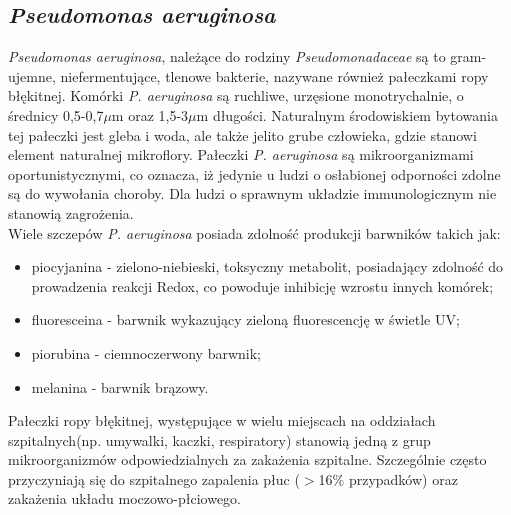 \documentclass[11pt,a4paper]{report}
\begin{document}
\subsection{\textit{Pseudomonas aeruginosa}}
\textit{Pseudomonas aeruginosa}, należące do rodziny \textit{Pseudomonadaceae} są to gram-ujemne, niefermentujące, tlenowe bakterie, nazywane również pałeczkami ropy błękitnej. Komórki \textit{P. aeruginosa} są ruchliwe, urzęsione monotrychalnie, o średnicy 0,5-0,7$\mu$m oraz 1,5-3$\mu$m długości\cite{ps_aer_ksiazka, medical_micro}.
Naturalnym środowiskiem bytowania tej pałeczki jest gleba i woda, ale także jelito grube człowieka, gdzie stanowi element naturalnej mikroflory.
Pałeczki \textit{P. aeruginosa} są mikroorganizmami oportunistycznymi, co oznacza, iż jedynie u ludzi o osłabionej odporności zdolne są do wywołania choroby. Dla ludzi o sprawnym układzie immunologicznym nie stanowią zagrożenia\cite{ps_aer_ksiazka}.\\
Wiele szczepów \textit{P. aeruginosa} posiada zdolność produkcji barwników takich jak:
\begin{itemize}
\item piocyjanina - zielono-niebieski, toksyczny metabolit, posiadający zdolność do prowadzenia reakcji Redox, co powoduje inhibicję wzrostu innych komórek;
\item fluoresceina - barwnik wykazujący zieloną fluorescencję w świetle UV;
\item piorubina - ciemnoczerwony barwnik;
\item melanina - barwnik brązowy\cite{pio, pio2, fluor}.
\end{itemize}
Pałeczki ropy błękitnej, występujące w wielu miejscach na oddziałach szpitalnych(np. umywalki, kaczki, respiratory) stanowią jedną z grup mikroorganizmów odpowiedzialnych za zakażenia szpitalne. Szczególnie często przyczyniają się do szpitalnego zapalenia płuc ($>$16$\%$ przypadków) oraz zakażenia układu moczowo-płciowego\cite{zakszpit16}.
\end{document}
